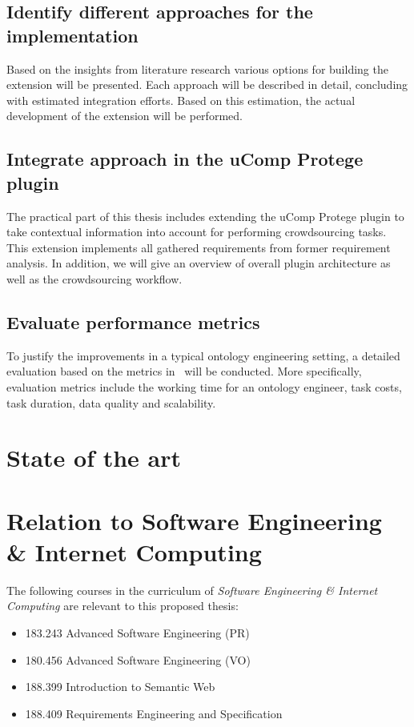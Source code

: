 \documentclass[12pt, notitlepage]{article}
\begin{document}
\subsection{Identify different approaches for the implementation}
Based on the insights from literature research various options for building the extension will be presented. Each approach will be described in detail, concluding with estimated integration efforts. Based on this estimation, the actual development of the extension will be performed. 
\subsection{Integrate approach in the uComp Protege plugin}
The practical part of this thesis includes extending the uComp Protege plugin to take contextual information into account for performing crowdsourcing tasks. This extension implements all gathered requirements from former requirement analysis. In addition, we will give an overview of overall plugin architecture as well as the crowdsourcing workflow. 
\subsection{Evaluate performance metrics}
To justify the improvements in a typical ontology engineering setting, a detailed evaluation based on the metrics in~\cite{wohlgenannt2016crowd} will be conducted. More specifically, evaluation metrics include the working time for an ontology engineer, task costs, task duration, data quality and scalability.  

\section{State of the art}
\section{Relation to Software Engineering \& Internet Computing}

The following courses in the curriculum of \emph{Software Engineering \& Internet Computing} are relevant to this proposed thesis:
\begin{itemize}
	\item 183.243 Advanced Software Engineering (PR)
	\item 180.456 Advanced Software Engineering (VO)
	\item 188.399 Introduction to Semantic Web
	\item 188.409 Requirements Engineering and Specification
\end{itemize}

\newpage


\end{document}
